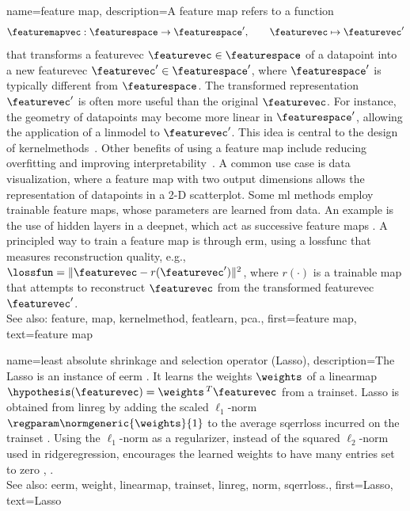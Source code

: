{name={feature map}, 
	description={A \gls{feature} \gls{map} refers to a \gls{function} 
		$$
		\featuremapvec: \featurespace \rightarrow \featurespace', \qquad \featurevec \mapsto \featurevec'
		$$
		that transforms a \gls{featurevec} $\featurevec \in \featurespace$ of 
 		a \gls{datapoint} into a new \gls{featurevec} $\featurevec' \in \featurespace'$, 
 		where $\featurespace'$ is typically different from $\featurespace$.
 		The transformed representation $\featurevec'$ is often more useful than the original 
 		$\featurevec$. For instance, the geometry of \glspl{datapoint} may become more linear 
 		in $\featurespace'$, allowing the application of a \gls{linmodel} to $\featurevec'$. 
 		This idea is central to the design of \glspl{kernelmethod}~\cite{LearningKernelsBook}.
 		Other benefits of using a \gls{feature} \gls{map} include reducing \gls{overfitting} and 
 		improving \gls{interpretability}~\cite{Ribeiro2016}. A common use case is \gls{data} 
 		visualization, where a \gls{feature} \gls{map} with two output dimensions allows the representation 
 		of \glspl{datapoint} in a 2-D \gls{scatterplot}. Some \gls{ml} methods employ trainable 
 		\gls{feature} \glspl{map}, whose \glspl{parameter} are learned from \gls{data}. An example is 
 		the use of hidden \glspl{layer} in a \gls{deepnet}, which act as successive \gls{feature} \glspl{map} 
 		\cite{MallatUnderstandingDeepLearning}. A principled way to train a \gls{feature} \gls{map} 
 		is through \gls{erm}, using a \gls{lossfunc} that measures reconstruction quality, 
 		e.g., $\lossfun = \|\featurevec - r(\featurevec')\|^2$, where $r(\cdot)$ is a trainable
 		\gls{map} that attempts to reconstruct $\featurevec$ from the transformed \gls{featurevec} $\featurevec'$.
				\\
		See also: \gls{feature}, \gls{map}, \gls{kernelmethod}, \gls{featlearn}, \gls{pca}.},
	first={feature map},
	text={feature map} 
}
 
{name={least absolute shrinkage and selection operator (Lasso)}, 
	description={The Lasso  is an 
		instance of \gls{eerm} \cite{hastie01statisticallearning}. It learns the \glspl{weight} 
		$\weights$ of a \gls{linearmap} $\hypothesis(\featurevec) = \weights\,^{T} \featurevec$ from a \gls{trainset}. 
		Lasso is obtained from \gls{linreg} by adding the scaled $\ell_{1}$-\gls{norm} 
		$\regparam \normgeneric{\weights}{1}$ to the average \gls{sqerrloss} incurred on 
		the \gls{trainset} \cite{Tibshirani1996}. Using the $\ell_{1}$-\gls{norm} as a \gls{regularizer}, 
		instead of the squared $\ell_{2}$-\gls{norm} used in \gls{ridgeregression}, encourages the 
		learned \glspl{weight} to have many entries set to zero \cite{Wain2019}, \cite{BuhlGeerBook}.
				\\
		See also: \gls{eerm}, \gls{weight}, \gls{linearmap}, \gls{trainset}, \gls{linreg}, \gls{norm}, \gls{sqerrloss}.},
	first={Lasso},
	text={Lasso} 
}
 
